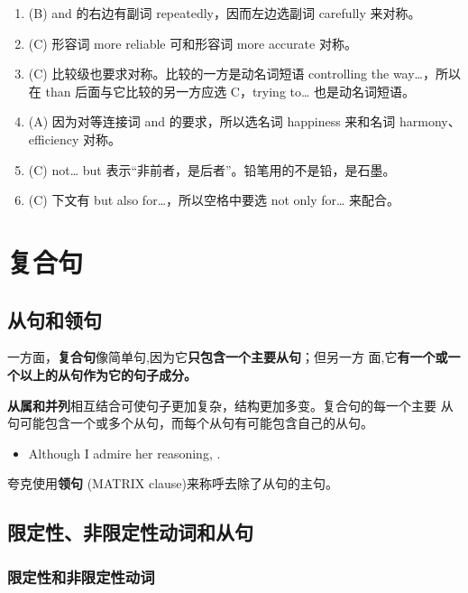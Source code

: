 \begin{enumerate}
\item (B) and 的右边有副词 repeatedly，因而左边选副词 carefully 来对称。

\item(C) 形容词 more reliable 可和形容词 more accurate 对称。

\item (C) 比较级也要求对称。比较的一方是动名词短语 controlling the way…，所以在 than 后面与它比较的另一方应选 C，trying to… 也是动名词短语。
\item (A) 因为对等连接词 and 的要求，所以选名词 happiness 来和名词 harmony、efficiency 对称。

\item  (C) not… but 表示“非前者，是后者”。铅笔用的不是铅，是石墨。

\item (C) 下文有 but also for…，所以空格中要选 not only for… 来配合。
\end{enumerate}

\chapter{复合句}

\section{从句和领句}

一方面，\textbf{复合句}像简单句,因为它\textbf{只包含一个主要从句}；但另一方
面,它\textbf{有一个或一个以上的从句作为它的句子成分。}

\textbf{从属和并列}相互结合可使句子更加复杂，结构更加多变。复合句的每一个主要
从句可能包含一个或多个从句，而每个从句有可能包含自己的从句。

\begin{itemize}
\item Although I admire her reasoning, .
\end{itemize}

夸克使用\textbf{领句} (MATRIX clause)来称呼去除了从句的主句。

\section{限定性、非限定性动词和从句}
\label{subsec:iffinite}

\subsection{限定性和非限定性动词}

